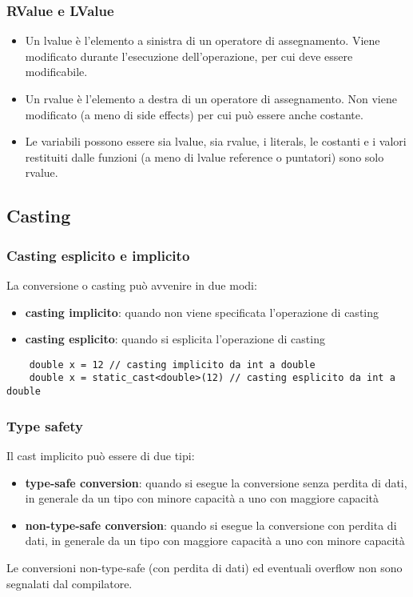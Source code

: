 \documentclass[a4paper]{article}
\begin{document}
\subsubsection*{RValue e LValue}
\begin{itemize}
	\item Un lvalue è l'elemento a sinistra di un operatore di assegnamento. Viene modificato durante l'esecuzione dell'operazione, per cui
	deve essere modificabile.
	\item Un rvalue è l'elemento a destra di un operatore di assegnamento. Non viene modificato (a meno di side effects) per cui può essere
	anche costante.
	\item Le variabili possono essere sia lvalue, sia rvalue, i literals, le costanti e i valori restituiti dalle funzioni (a meno di lvalue
	reference o puntatori) sono solo rvalue.
\end{itemize}

\newpage

\subsection{Casting} \label{casting}
\subsubsection*{Casting esplicito e implicito}
La conversione o casting può avvenire in due modi:
\begin{itemize}
	\item \textbf{casting implicito}: quando non viene specificata l'operazione di casting
	\item \textbf{casting esplicito}: quando si esplicita l'operazione di casting
\end{itemize}
\begin{lstlisting}
	double x = 12 // casting implicito da int a double
	double x = static_cast<double>(12) // casting esplicito da int a double
\end{lstlisting}

\subsubsection*{Type safety}
Il cast implicito può essere di due tipi:
\begin{itemize}
	\item \textbf{type-safe conversion}: quando si esegue la conversione senza perdita di dati, in generale da un tipo con
	minore capacità a uno con maggiore capacità
	\item \textbf{non-type-safe conversion}: quando si esegue la conversione con perdita di dati, in generale da un tipo con
	maggiore capacità a uno con minore capacità
\end{itemize}
Le conversioni non-type-safe (con perdita di dati) ed eventuali overflow non sono segnalati dal compilatore.
\end{document}
